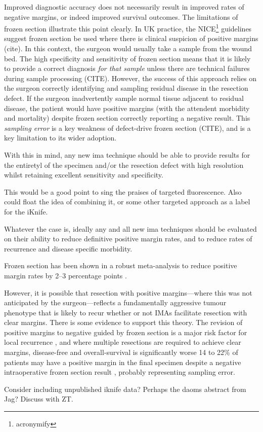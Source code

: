 Improved diagnostic accuracy does not necessarily result in improved rates of negative margins, or indeed improved survival outcomes.
The limitations of frozen section illustrate this point clearly.
In UK practice, the NICE\footnote{acronymify} guidelines suggest frozen section be used where there is clinical suspicion of positive margins (cite).
In this context, the surgeon would usually take a sample from the wound bed.
The high specificity and sensitivity of frozen section means that it is likely to provide a correct diagnosis \textit{for that sample} unless there are technical failures during sample processing (CITE).
However, the success of this approach relies on the surgeon correctly identifying and sampling residual disease in the resection defect. 
If the surgeon inadvertently sample normal tissue adjacent to residual disease, the patient would have positive margins (with the attendent morbidity and mortality) despite frozen section correctly reporting a negative result.
This \textit{sampling error} is a key weakness of defect-drive frozen section (CITE), and is a key limitation to its wider adoption.

With this in mind, any new \gls{ima} technique should be able to provide results for the entiretyl of the specimen and/or the resection defect with high resolution whilst retaining excellent sensitivity and specificity.

This would be a good point to sing the praises of targeted fluorescence.
Also could float the idea of combining it, or some other targeted approach as a label for the iKnife.


Whatever the case is, ideally any and all new \gls{ima} techniques should be evaluated on their ability to reduce definitive positive margin rates, and to reduce rates of recurrence and disease specific morbidity.

Frozen section has been shown in a robust meta-analysis to reduce positive margin rates by 2--3 percentage points \cite{gorpheSystematicReviewMetaanalysis2019}.

However, it is possible that resection with positive margins---where this was not anticipated by the surgeon---reflects a fundamentally aggressive tumour phenotype that is likely to recur whether or not IMAs facilitate resection with clear margins.
There is some evidence to support this theory.
The revision of positive margins to negative guided by frozen section is a major risk factor for local recurrence \cite{ettlt.PositiveFrozenSection2016}, and where multiple resections are required to achieve clear margins, disease-free and overall-survival is significantly worse \cite{mooreTransoralRoboticSurgery2018}
14 to 22\% of patients may have a positive margin in the final specimen despite a negative intraoperative frozen section result \cite{ordAccuracyFrozenSections1997, due.RefiningUtilityRole2016}, probably representing sampling error.

Consider including unpublished iknife data? Perhaps the daoms abstract from Jag? Discuss with ZT.

